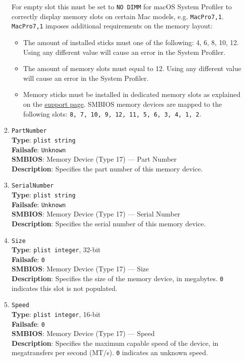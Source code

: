 \documentclass[]{article}
\providecommand{\tightlist}{%
  \setlength{\itemsep}{0pt}\setlength{\parskip}{0pt}}
\begin{document}
\begin{enumerate}
  For empty slot this must be set to \texttt{NO DIMM} for macOS System Profiler
  to correctly display memory slots on certain Mac models, e.g. \texttt{MacPro7,1}.
  \texttt{MacPro7,1} imposes additional requirements on the memory layout:
  \begin{itemize}
    \tightlist
    \item The amount of installed sticks must one of the following: 4, 6, 8, 10, 12.
          Using any different value will cause an error in the System Profiler.
    \item The amount of memory slots must equal to 12. Using any different value
          will cause an error in the System Profiler.
    \item Memory sticks must be installed in dedicated memory slots as explained
          on the \href{https://support.apple.com/HT210103}{support page}. SMBIOS
          memory devices are mapped to the following slots:
          \texttt{8, 7, 10, 9, 12, 11, 5, 6, 3, 4, 1, 2}.
  \end{itemize}

\item
  \texttt{PartNumber}\\
  \textbf{Type}: \texttt{plist\ string}\\
  \textbf{Failsafe}: \texttt{Unknown}\\
  \textbf{SMBIOS}: Memory Device (Type 17) --- Part Number\\
  \textbf{Description}: Specifies the part number of this memory device.

\item
  \texttt{SerialNumber}\\
  \textbf{Type}: \texttt{plist\ string}\\
  \textbf{Failsafe}: \texttt{Unknown}\\
  \textbf{SMBIOS}: Memory Device (Type 17) --- Serial Number\\
  \textbf{Description}: Specifies the serial number of this memory device.

\item
  \texttt{Size}\\
  \textbf{Type}: \texttt{plist\ integer}, 32-bit\\
  \textbf{Failsafe}: \texttt{0}\\
  \textbf{SMBIOS}: Memory Device (Type 17) --- Size\\
  \textbf{Description}: Specifies the size of the memory device, in megabytes.
  \texttt{0} indicates this slot is not populated.

\item
  \texttt{Speed}\\
  \textbf{Type}: \texttt{plist\ integer}, 16-bit\\
  \textbf{Failsafe}: \texttt{0}\\
  \textbf{SMBIOS}: Memory Device (Type 17) --- Speed\\
  \textbf{Description}: Specifies the maximum capable speed of the device,
  in megatransfers per second (MT/s). \texttt{0} indicates an unknown speed.

\end{enumerate}
\end{document}
